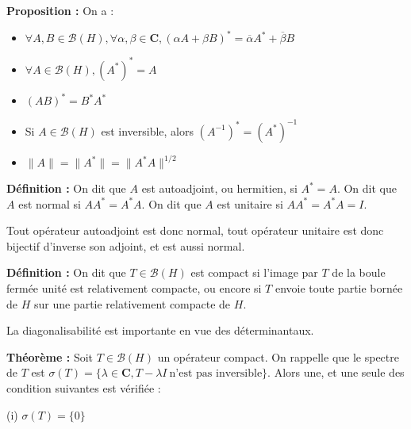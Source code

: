 \documentclass[12pt]{article}
\begin{document}
\textbf{Proposition :} On a : 

\medskip

\begin{itemize}

  \item $\forall A,B \in \mathcal B(H), \forall \alpha, \beta \in \mathbf C, (\alpha A + \beta B)^* = \overline \alpha A^* + \overline \beta B $

  \item $ \forall A \in \mathcal B(H), (A^*)^* = A $

  \item $ (AB)^* = B^* A^* $

  \item Si $A \in \mathcal B(H) $ est inversible, alors $ (A^{-1})^* = (A^*)^{-1} $

  \item $ \|A\| = \|A^*\| = \|A^*A\|^{1/2} $

\end{itemize}

\medskip

\textbf{Définition :} On dit que $A$ est autoadjoint, ou hermitien, si $ A^* = A $. On dit que $A$ est normal si $AA^* = A^*A$. On dit que $A$ est unitaire si $AA^* = A^*A = I$.

Tout opérateur autoadjoint est donc normal, tout opérateur unitaire est donc bijectif d'inverse son adjoint, et est aussi normal. 







\textbf{Définition :} On dit que $ T \in \mathcal B(H) $ est compact si l'image par $T$ de la boule fermée unité est relativement compacte, ou encore si $T$ envoie toute partie bornée de $H$ sur une partie relativement compacte de $H$.

La diagonalisabilité est importante en vue des déterminantaux.

\textbf{Théorème :} Soit $T \in \mathcal B(H) $ un opérateur compact. On rappelle que le spectre de $T$ est $ \sigma(T) = \{ \lambda \in \mathbf C, T - \lambda I \: \text{n'est pas inversible} \}$. Alors une, et une seule des condition suivantes est vérifiée :


(i) $ \sigma(T) = \{ 0 \} $
\end{document}
